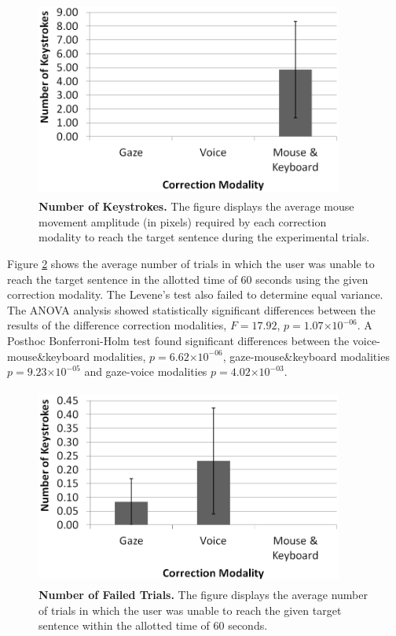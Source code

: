 \documentclass[]{article}
\providecommand{\e}[1]{\ensuremath{\times 10^{#1}}}
\begin{document}
\begin{figure}[ht]
\begin{center}
\vspace{-3mm}
\includegraphics[width=0.9\textwidth,height=65mm]{figures/keystrokes.png}
\end{center}
\caption{\textbf{Number of Keystrokes.} The figure displays the average mouse movement amplitude (in pixels)
required by each correction modality to reach the target sentence during the experimental trials.}
\label{keystrokes}
\end{figure}


Figure \ref{failFig} shows the average number of trials in which the user was unable to reach the target sentence in the
allotted time of 60 seconds using the given correction modality. The Levene's test also failed to determine equal
variance. The ANOVA analysis showed statistically significant differences between the results of the
difference correction modalities, $F=17.92$, $p=1.07\e{-06}$.   A Posthoc Bonferroni-Holm test found
significant differences between the voice-mouse\&keyboard modalities, $p=6.62\e{-06}$, gaze-mouse\&keyboard modalities
$p=9.23\e{-05}$ and gaze-voice modalities $p=4.02\e{-03}$.

\begin{figure}[ht]
\begin{center}
\vspace{-3mm}
\includegraphics[width=0.9\textwidth,height=65mm]{figures/fail.png}
\end{center}
\caption{\textbf{Number of Failed Trials.} The figure displays the average number of trials in which the user
was unable to reach the given target sentence within the allotted time of 60 seconds.}
\label{failFig}
\end{figure}
\end{document}
